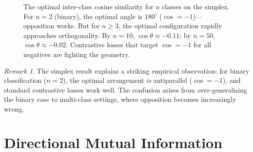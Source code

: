 \documentclass[11pt,a4paper]{article}
\theoremstyle{remark}
\newtheorem{remark}{Remark}
\begin{document}
\begin{figure}[ht]
\centering
{}
\caption{The optimal inter-class cosine similarity for $n$ classes on the simplex.
For $n = 2$ (binary), the optimal angle is $180^\circ$ ($\cos = -1$)---opposition works.
But for $n \geq 3$, the optimal configuration rapidly approaches orthogonality.
By $n = 10$, $\cos\theta \approx -0.11$; by $n = 50$, $\cos\theta \approx -0.02$.
Contrastive losses that target $\cos = -1$ for all negatives are fighting the geometry.}
\label{fig:simplex}
\end{figure}

\begin{remark}
The simplex result explains a striking empirical observation: for binary classification ($n = 2$), the optimal arrangement \emph{is} antiparallel ($\cos = -1$), and standard contrastive losses work well.
The confusion arises from over-generalizing the binary case to multi-class settings, where opposition becomes increasingly wrong.
\end{remark}


\section{Directional Mutual Information}
\label{sec:information}
\end{document}
